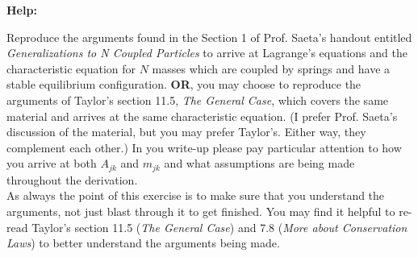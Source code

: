 \documentclass[11pt,letterpaper,boxed]{../hmcpsetrhino}
\begin{document}
\textbf{Help:}

\begin{problem}[i]
Reproduce the arguments found in the Section 1 of Prof. Saeta's handout entitled \textit{Generalizations to N Coupled Particles} to arrive at Lagrange's equations and the characteristic equation for $N$ masses which are coupled by springs and have a stable equilibrium configuration. \textbf{OR}, you may choose to reproduce the arguments of Taylor's section 11.5, \textit{The General Case}, which covers the same material and arrives at the same characteristic equation. (I prefer Prof. Saeta's discussion of the material, but you may prefer Taylor's. Either way, they complement each other.) In you write-up please pay particular attention to how you arrive at both $A_{jk}$ and $m_{jk}$ and what assumptions are being made throughout the derivation.\\

As always the point of this exercise is to make sure that you understand the arguments, not just blast through it to get finished. You may find it helpful to re-read Taylor's section 11.5 (\textit{The General Case}) and 7.8 (\textit{More about Conservation Laws}) to better understand the arguments being made.

\end{problem}
\begin{solution}


\vfill
\end{solution}
\end{document}
